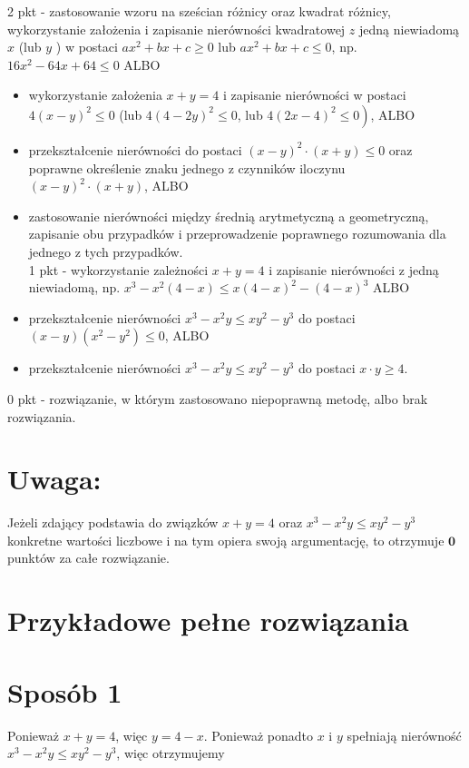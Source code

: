 \documentclass[10pt]{article}
\begin{document}
2 pkt - zastosowanie wzoru na sześcian różnicy oraz kwadrat różnicy, wykorzystanie założenia i zapisanie nierówności kwadratowej $z$ jedną niewiadomą $x$ (lub $y$ ) w postaci $a x^{2}+b x+c \geq 0$ lub $a x^{2}+b x+c \leq 0$, np. $16 x^{2}-64 x+64 \leq 0$ ALBO

\begin{itemize}
  \item wykorzystanie założenia $x+y=4$ i zapisanie nierówności w postaci $4(x-y)^{2} \leq 0$ (lub $4(4-2 y)^{2} \leq 0$, lub $\left.4(2 x-4)^{2} \leq 0\right)$, ALBO
  \item przekształcenie nierówności do postaci $(x-y)^{2} \cdot(x+y) \leq 0$ oraz poprawne określenie znaku jednego z czynników iloczynu $(x-y)^{2} \cdot(x+y)$, ALBO
  \item zastosowanie nierówności między średnią arytmetyczną a geometryczną, zapisanie obu przypadków i przeprowadzenie poprawnego rozumowania dla jednego z tych przypadków.\\
1 pkt - wykorzystanie zależności $x+y=4$ i zapisanie nierówności z jedną niewiadomą, np. $x^{3}-x^{2}(4-x) \leq x(4-x)^{2}-(4-x)^{3}$ ALBO
  \item przekształcenie nierówności $x^{3}-x^{2} y \leq x y^{2}-y^{3}$ do postaci $(x-y)\left(x^{2}-y^{2}\right) \leq 0$, ALBO
  \item przekształcenie nierówności $x^{3}-x^{2} y \leq x y^{2}-y^{3}$ do postaci $x \cdot y \geq 4$.
\end{itemize}

0 pkt - rozwiązanie, w którym zastosowano niepoprawną metodę, albo brak rozwiązania.

\section*{Uwaga:}
Jeżeli zdający podstawia do związków $x+y=4$ oraz $x^{3}-x^{2} y \leq x y^{2}-y^{3}$ konkretne wartości liczbowe i na tym opiera swoją argumentację, to otrzymuje $\mathbf{0}$ punktów za całe rozwiązanie.

\section*{Przykładowe pełne rozwiązania}
\section*{Sposób 1}
Ponieważ $x+y=4$, więc $y=4-x$. Ponieważ ponadto $x$ i $y$ spełniają nierówność $x^{3}-x^{2} y \leq x y^{2}-y^{3}$, więc otrzymujemy
\end{document}
